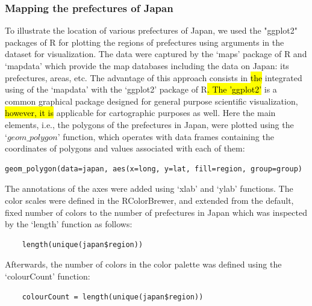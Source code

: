 \documentclass[land,article,submit,pdftex,moreauthors]{Definitions/mdpi}
\begin{document}
\subsubsection{Mapping the prefectures of Japan}

To illustrate the location of various prefectures of Japan, we used the "ggplot2" packages of R for plotting the regions of prefectures using arguments in the dataset for visualization. The data were captured by the ‘maps’ package of R \cite{Beckeretal2013} and ‘mapdata’ which provide the map databases including the data on Japan: its prefectures, areas, etc. The advantage of this approach consists in \hl{the }integrated using of the ‘mapdata’ with the ‘ggplot2’ package of R\hl{. The 'ggplot2'} is a common graphical package designed for general purpose scientific visualization, \hl{however, it is }applicable for cartographic purposes as well. Here the main elements, i.e., the polygons of the prefectures in Japan, were plotted using the $‘geom\_polygon’$ function, which operates with data frames containing the coordinates of polygons and values associated with each of them: 
\begin{verbatim}geom_polygon(data=japan, aes(x=long, y=lat, fill=region, group=group)\end{verbatim} 

The annotations of the axes were added using ‘xlab’ and ‘ylab’ functions. The color scales were defined in the RColorBrewer, and extended from the default, fixed number of colors to the number of prefectures in Japan which was inspected by the ‘length’ function as follows: 
\begin{verbatim}
	length(unique(japan$region))
\end{verbatim} 
Afterwards, the number of colors in the color palette was defined using the ‘colourCount’ function: 
\begin{verbatim}
	colourCount = length(unique(japan$region))
\end{verbatim}
\end{document}
